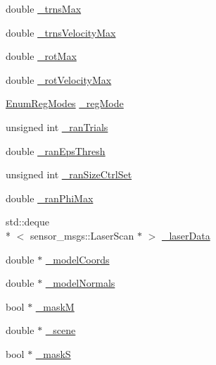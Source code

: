 \begin{DoxyCompactItemize}
\item 
double \hyperlink{classohm__tsd__slam__ref_1_1ThreadLocalize_a943d9246b84ff11c2c01f7af1a3730f9}{\-\_\-trns\-Max}
\item 
double \hyperlink{classohm__tsd__slam__ref_1_1ThreadLocalize_a59316ea269ecac73e614061fa3f618df}{\-\_\-trns\-Velocity\-Max}
\item 
double \hyperlink{classohm__tsd__slam__ref_1_1ThreadLocalize_a4eec8ac0c4da6cc90fe5dcc22cee2447}{\-\_\-rot\-Max}
\item 
double \hyperlink{classohm__tsd__slam__ref_1_1ThreadLocalize_ab72a7278c4ce34dab852571b7c83705c}{\-\_\-rot\-Velocity\-Max}
\item 
\hyperlink{classohm__tsd__slam__ref_1_1ThreadLocalize_ac5ed59506607265dc4c38a64cf36156f}{Enum\-Reg\-Modes} \hyperlink{classohm__tsd__slam__ref_1_1ThreadLocalize_ace3a4195d80299e3eb37be6c3a06a218}{\-\_\-reg\-Mode}
\item 
unsigned int \hyperlink{classohm__tsd__slam__ref_1_1ThreadLocalize_a756d269b7f0782d3e789f29bfc7d838d}{\-\_\-ran\-Trials}
\item 
double \hyperlink{classohm__tsd__slam__ref_1_1ThreadLocalize_a2e9f4af9a78a5c16b1a4966b1e28a27b}{\-\_\-ran\-Eps\-Thresh}
\item 
unsigned int \hyperlink{classohm__tsd__slam__ref_1_1ThreadLocalize_a33d533907a160e94d357ecd3d8226f9b}{\-\_\-ran\-Size\-Ctrl\-Set}
\item 
double \hyperlink{classohm__tsd__slam__ref_1_1ThreadLocalize_a5ab8f03d41a726e561c95be6d6f090a7}{\-\_\-ran\-Phi\-Max}
\item 
std\-::deque\\*
$<$ sensor\-\_\-msgs\-::\-Laser\-Scan $\ast$ $>$ \hyperlink{classohm__tsd__slam__ref_1_1ThreadLocalize_ab4560c87e6163708f39d4cdfc2f8a074}{\-\_\-laser\-Data}
\item 
double $\ast$ \hyperlink{classohm__tsd__slam__ref_1_1ThreadLocalize_a3339b24a6b047266ceda1c160c79b1de}{\-\_\-model\-Coords}
\item 
double $\ast$ \hyperlink{classohm__tsd__slam__ref_1_1ThreadLocalize_ab787c1c72a9d4ac14e08c05519530e63}{\-\_\-model\-Normals}
\item 
bool $\ast$ \hyperlink{classohm__tsd__slam__ref_1_1ThreadLocalize_a00672731c254282c9e469636245b49ba}{\-\_\-mask\-M}
\item 
double $\ast$ \hyperlink{classohm__tsd__slam__ref_1_1ThreadLocalize_a44d298a710aa05043423e8894e8454a0}{\-\_\-scene}
\item 
bool $\ast$ \hyperlink{classohm__tsd__slam__ref_1_1ThreadLocalize_a0f697cbf384346d1c13504830a83d768}{\-\_\-mask\-S}

\end{DoxyCompactItemize}
